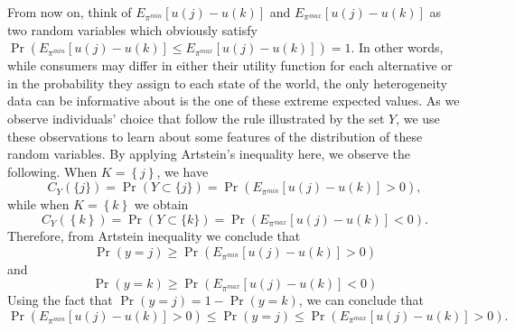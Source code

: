 \documentclass{article}
\begin{document}
From now on, think of $E_{\pi ^{min}}\left[ u\left( j\right) -u\left(
k\right) \right] $ and $E_{\pi ^{max}}\left[ u\left( j\right) -u\left(
k\right) \right] $ as two random variables which obviously satisfy $\Pr
\left( E_{\pi ^{min}}\left[ u\left( j\right) -u\left( k\right) \right] \leq
E_{\pi ^{max}}\left[ u\left( j\right) -u\left( k\right) \right] \right) =1$.
In other words, while consumers may differ in either their utility function
for each alternative or in the probability they assign to each state of the
world, the only heterogeneity data can be informative about is the one of
these extreme expected values. As we observe individuals' choice that follow
the rule illustrated by the set $Y$, we use these observations to learn
about some features of the distribution of these random variables. By
applying Artstein's inequality here, we observe the following. When $%
K=\left\{ j\right\} $, we have 
\begin{equation*}
C_{Y}\left( \{j\}\right) =\Pr \left( Y\subset \{j\}\right) =\Pr \left(
E_{\pi ^{min}}\left[ u\left( j\right) -u\left( k\right) \right] >0\right) ,
\end{equation*}%
while when $K=\left\{ k\right\} $ we obtain 
\begin{equation*}
C_{Y}\left( \left\{ k\right\} \right) =\Pr \left( Y\subset \{k\}\right) =\Pr
\left( E_{\pi ^{max}}\left[ u\left( j\right) -u\left( k\right) \right]
<0\right) .
\end{equation*}%
Therefore, from Artstein inequality we conclude that%
\begin{equation*}
\Pr (y=j)\geq \Pr \left( E_{\pi ^{min}}\left[ u\left( j\right) -u\left(
k\right) \right] >0\right)
\end{equation*}%
and 
\begin{equation*}
\Pr \left( y=k\right) \geq \Pr \left( E_{\pi ^{max}}\left[ u\left( j\right)
-u\left( k\right) \right] <0\right)
\end{equation*}%
Using the fact that $\Pr \left( y=j\right) =1-\Pr (y=k)$, we can conclude
that 
\begin{equation*}
\Pr \left( E_{\pi ^{min}}\left[ u\left( j\right) -u\left( k\right) \right]
>0\right) \leq \Pr (y=j)\leq \Pr \left( E_{\pi ^{max}}\left[ u\left(
j\right) -u\left( k\right) \right] >0\right) .
\end{equation*}
\end{document}
